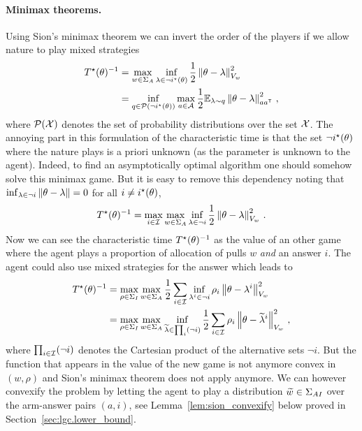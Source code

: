 \paragraph{Minimax theorems.} Using Sion's minimax theorem we can invert the order of the players if we allow nature to play mixed strategies
\begin{align}
T^{\star}(\theta)^{-1} &= \max_{w \in \Sigma_A} \inf_{\lambda\in \neg i^\star(\theta)} \frac{1}{2} \left\lVert\theta - \lambda\right\rVert_{V_w}^2 \label{eq:sion} \\
&= \inf_{q\in \mathcal{P}(\neg i^\star(\theta))} \max_{a\in\mathcal{A}}\frac{1}{2}\mathbb{E}_{\lambda\sim q}\left\lVert\theta - \lambda\right\rVert_{aa^{\mathsf{\scriptscriptstyle T}}}^2\nonumber\,,
\end{align}
where $\mathcal{P}(\mathcal{X})$ denotes the set of probability distributions over the set $\mathcal{X}$. The annoying part in this formulation of the characteristic time is that the set $\neg i^\star(\theta)$ where the nature plays is a priori unknown (as the parameter is unknown to the agent). Indeed, to find an asymptotically optimal algorithm one should somehow solve this minimax game. But it is easy to remove this dependency noting that $\inf_{\lambda\in\neg i}\left\lVert\theta -\lambda\right\rVert=0$ for all $i\neq i^\star(\theta)$,
\[
T^{\star}(\theta)^{-1} = \max_{i\in\mathcal{I}}\max_{w \in \Sigma_A} \inf_{\lambda\in \neg i } \frac{1}{2}\left\lVert\theta - \lambda\right\rVert_{V_w}^2\,.
\]
Now we can see the characteristic time $T^{\star}(\theta)^{-1}$ as the value of an other game where the agent plays a proportion of allocation of pulls $w$ \emph{and} an answer $i$. The agent could also use mixed strategies for the answer which leads to
\begin{align*}
T^{\star}(\theta)^{-1} &= \max_{\rho\in\Sigma_I}\max_{w \in \Sigma_A}  \frac{1}{2}\sum_{i\in \mathcal{I} }\inf_{\lambda^i\in\neg i}\rho_i\left\lVert\theta - \lambda^i\right\rVert_{V_w}^2\\
& =\max_{\rho\in\Sigma_I}\max_{w \in \Sigma_A}\inf_{\widetilde{\lambda}\in\prod_i(\neg i)}  \frac{1}{2}\sum_{i\in \mathcal{I} }\rho_i\left\lVert\theta - \widetilde{\lambda}^i\right\rVert_{V_w}^2\,,
\end{align*}
where $\prod_{i\in\mathcal{I}}(\neg i)$ denotes the Cartesian product of the alternative sets $\neg i$. But the function that appears in the value of the new game is not anymore convex in $(w,\rho)$ and Sion's minimax theorem does not apply anymore. We can however convexify the problem by letting the agent to play a distribution $\widetilde{w}\in\Sigma_{AI}$ over the arm-answer pairs $(a,i)$, see Lemma~\ref{lem:sion_convexify} below proved in Section~\ref{sec:lgc.lower_bound}.
